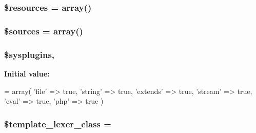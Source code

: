 \subsubsection[{\$resources}]{\setlength{\rightskip}{0pt plus 5cm}\$resources = array()\hspace{0.3cm}{\ttfamily [static]}}\label{class_smarty___resource_ad57e7e99506ffd448d98e036b1a8da50}
\hypertarget{class_smarty___resource_aa4b437d19a2caf088c80e03e1539a316}{}
\subsubsection[{\$sources}]{\setlength{\rightskip}{0pt plus 5cm}\$sources = array()\hspace{0.3cm}{\ttfamily [static]}}\label{class_smarty___resource_aa4b437d19a2caf088c80e03e1539a316}
\hypertarget{class_smarty___resource_a686d06923a58590ced2aae1c066d977e}{}
\subsubsection[{\$sysplugins}]{\setlength{\rightskip}{0pt plus 5cm}\$sysplugins\hspace{0.3cm}{\ttfamily [static]}, {\ttfamily [protected]}}\label{class_smarty___resource_a686d06923a58590ced2aae1c066d977e}
{\bfseries Initial value\+:}
\begin{DoxyCode}
= array(
        \textcolor{stringliteral}{'file'} => \textcolor{keyword}{true},
        \textcolor{stringliteral}{'string'} => \textcolor{keyword}{true},
        \textcolor{stringliteral}{'extends'} => \textcolor{keyword}{true},
        \textcolor{stringliteral}{'stream'} => \textcolor{keyword}{true},
        \textcolor{stringliteral}{'eval'} => \textcolor{keyword}{true},
        \textcolor{stringliteral}{'php'} => \textcolor{keyword}{true}
    )
\end{DoxyCode}
\hypertarget{class_smarty___resource_a134f002da1134c7b756f1d48c9b2ad56}{}
\subsubsection[{\$template\+\_\+lexer\+\_\+class}]{\setlength{\rightskip}{0pt plus 5cm}\$template\+\_\+lexer\+\_\+class = \textquotesingle{}}\label{class_smarty___resource_a134f002da1134c7b756f1d48c9b2ad56}
\hypertarget{class_smarty___resource_a5861bfb4f75ed665b42ce8eba8ae51f8}{}
